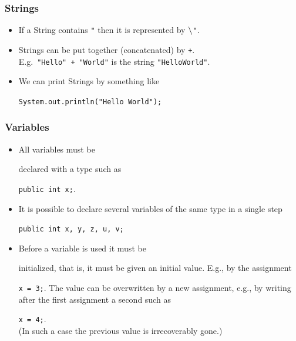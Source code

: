 \documentclass{beamer}
\newcommand{\q}{\mbox{"}}
\renewcommand{\b}{\mbox{$\tt\backslash$}}
\def\textttb#1{\mcolor{blue}{\texttt{#1}}}
\def\mcolor#1#2{\rule{0ex}{0ex}\color{#1}#2\color{black}{}}
\begin{document}
\begin{frame}
\frametitle{Strings}
\begin{itemize}
\item If a String contains \texttt{\q} then it is represented by \texttt{$\tt\b$\q}.
\item Strings can be put together (concatenated) by \texttt{+}.\\ E.g.\
  \texttt{\q{}Hello\q{} + \q{}World\q{}} is the string \texttt{\q{}HelloWorld\q{}}.
\item We can print Strings by something like \mcolor{blue}{\texttt{System.out.println(\q{}Hello World\q{});}}
\end{itemize}
\end{frame}

\begin{frame}
\frametitle{Variables}
\begin{itemize}
\item All variables must be \mcolor{blue}{declared} with a type such as\\ \textttb{public int x;}.
\item It is possible to declare several variables of the same type in a single step \textttb{public int x, y, z, u, v;}
\item Before a variable is used it must be \mcolor{blue}{initialized}, that is, it must be given an initial value.
  E.g., by the assignment \textttb{x = 3;}. The value can be
  overwritten by a new assignment, e.g., by writing after the first assignment a second such as \textttb{x = 4;}.\\
(In such a case the previous value is irrecoverably gone.)
\end{itemize}
\end{frame}
\end{document}
